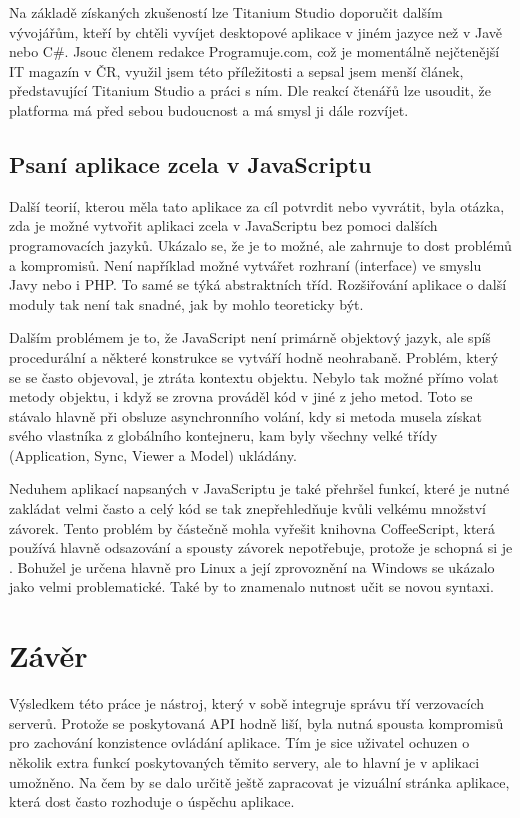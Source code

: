 Na základě získaných zkušeností lze Titanium Studio doporučit dalším vývojářům, kteří by chtěli vyvíjet desktopové aplikace v jiném jazyce než v Javě nebo C\#. Jsouc členem redakce Programuje.com, což je momentálně nejčtenější IT magazín v ČR, využil jsem této příležitosti a sepsal jsem menší článek\cite{selfpromo}, představující Titanium Studio a práci s ním. Dle reakcí čtenářů lze usoudit, že platforma má před sebou budoucnost a má smysl ji dále rozvíjet.

\subsection{Psaní aplikace zcela v JavaScriptu}

Další teorií, kterou měla tato aplikace za cíl potvrdit nebo vyvrátit, byla otázka, zda je možné vytvořit aplikaci zcela v JavaScriptu bez pomoci dalších programovacích jazyků. Ukázalo se, že je to možné, ale zahrnuje to dost problémů a kompromisů. Není například možné vytvářet rozhraní (interface) ve smyslu Javy nebo i PHP. To samé se týká abstraktních tříd. Rozšiřování aplikace o další moduly tak není tak snadné, jak by mohlo teoreticky být.

Dalším problémem je to, že JavaScript není primárně objektový jazyk, ale spíš procedurální a některé konstrukce se vytváří hodně neohrabaně. Problém, který se se často objevoval, je ztráta kontextu objektu. Nebylo tak možné přímo volat metody objektu, i když se zrovna prováděl kód v jiné z jeho metod. Toto se stávalo hlavně při obsluze asynchronního volání, kdy si metoda musela získat svého vlastníka z globálního kontejneru, kam byly všechny velké třídy (Application, Sync, Viewer a Model) ukládány.

Neduhem aplikací napsaných v JavaScriptu je také přehršel funkcí, které je nutné zakládat velmi často a celý kód se tak znepřehledňuje kvůli velkému množství závorek. Tento problém by částečně mohla vyřešit knihovna CoffeeScript\cite{coffeescript}, která používá hlavně odsazování a spousty závorek nepotřebuje, protože je schopná si je . Bohužel je určena hlavně pro Linux a její zprovoznění na Windows se ukázalo jako velmi problematické. Také by to znamenalo nutnost učit se novou syntaxi.

\section{Závěr}

Výsledkem této práce je nástroj, který v sobě integruje správu tří verzovacích serverů. Protože se poskytovaná API hodně liší, byla nutná spousta kompromisů pro zachování konzistence ovládání aplikace. Tím je sice uživatel ochuzen o několik extra funkcí poskytovaných těmito servery, ale to hlavní je v aplikaci umožněno. Na čem by se dalo určitě ještě zapracovat je vizuální stránka aplikace, která dost často rozhoduje o úspěchu aplikace.

